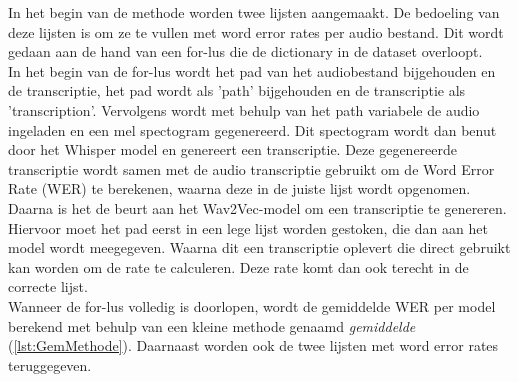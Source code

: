 In het begin van de methode worden twee lijsten aangemaakt. De bedoeling van deze lijsten is om ze te vullen met word error rates per audio bestand. Dit wordt gedaan aan de hand van een for-lus die de dictionary in de dataset overloopt.\\

In het begin van de for-lus wordt het pad van het audiobestand bijgehouden en de transcriptie, het pad wordt als 'path' bijgehouden en de transcriptie als 'transcription'. Vervolgens wordt met behulp van het path variabele de audio ingeladen en een mel spectogram gegenereerd. Dit spectogram wordt dan benut door het Whisper model en genereert een transcriptie. Deze gegenereerde transcriptie wordt samen met de audio transcriptie gebruikt om de Word Error Rate (WER) te berekenen, waarna deze in de juiste lijst wordt opgenomen.\\

Daarna is het de beurt aan het Wav2Vec-model om een transcriptie te genereren. Hiervoor moet het pad eerst in een lege lijst worden gestoken, die dan aan het model wordt meegegeven. Waarna dit een transcriptie oplevert die direct gebruikt kan worden om de rate te calculeren. Deze rate komt dan ook terecht in de correcte lijst.\\

Wanneer de for-lus volledig is doorlopen, wordt de gemiddelde WER per model berekend met behulp van een kleine methode genaamd \emph{gemiddelde} (\ref{lst:GemMethode}). Daarnaast worden ook de twee lijsten met word error rates teruggegeven.

